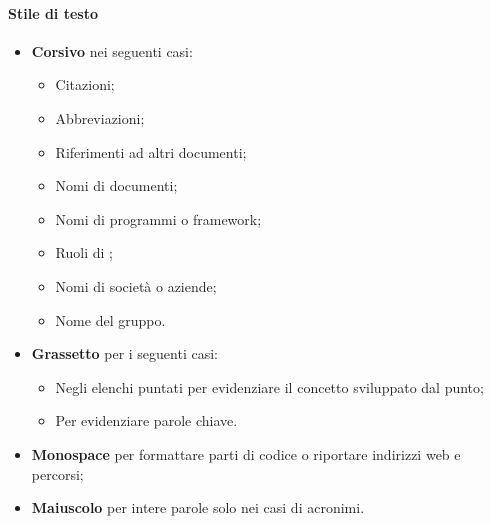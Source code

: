 \paragraph*{Stile di testo}
\begin{itemize}
\item \textbf{Corsivo}  nei seguenti casi:
  \begin{itemize}
  \item Citazioni;
  \item Abbreviazioni;
  \item Riferimenti ad altri documenti;
  \item Nomi di documenti;
  \item Nomi di programmi o framework;
  \item Ruoli di ;
  \item Nomi di societ\`a o aziende;
  \item Nome del gruppo.
  \end{itemize}
\item \textbf{Grassetto} per i seguenti casi:
  \begin{itemize}
  \item Negli elenchi puntati per evidenziare il concetto sviluppato dal punto;
  \item Per evidenziare parole chiave.
  \end{itemize}
\item \textbf{Monospace} per formattare parti di codice o riportare indirizzi web e percorsi;
\item \textbf{Maiuscolo} per intere parole solo nei casi di acronimi.
\end{itemize}

